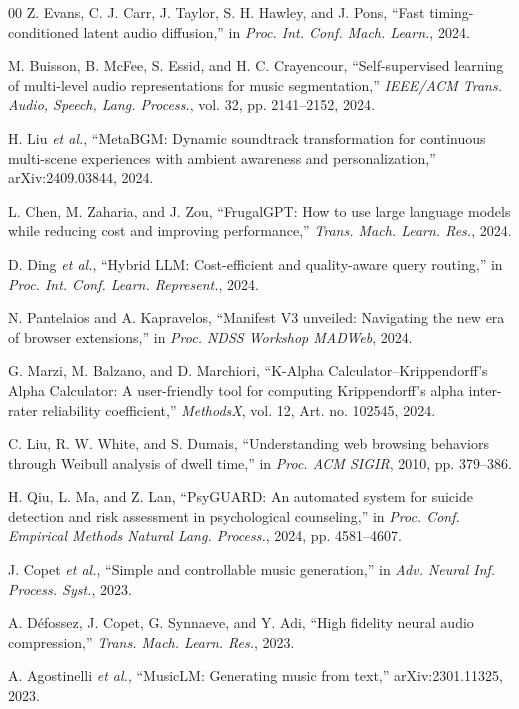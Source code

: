 \documentclass[conference]{IEEEtran}
\begin{document}
\begin{thebibliography}{00}
 Z. Evans, C. J. Carr, J. Taylor, S. H. Hawley, and J. Pons, ``Fast timing-conditioned latent audio diffusion,'' in \emph{Proc. Int. Conf. Mach. Learn.}, 2024.

 M. Buisson, B. McFee, S. Essid, and H. C. Crayencour, ``Self-supervised learning of multi-level audio representations for music segmentation,'' \emph{IEEE/ACM Trans. Audio, Speech, Lang. Process.}, vol. 32, pp. 2141--2152, 2024.

 H. Liu \emph{et al.}, ``MetaBGM: Dynamic soundtrack transformation for continuous multi-scene experiences with ambient awareness and personalization,'' arXiv:2409.03844, 2024.

 L. Chen, M. Zaharia, and J. Zou, ``FrugalGPT: How to use large language models while reducing cost and improving performance,'' \emph{Trans. Mach. Learn. Res.}, 2024.

 D. Ding \emph{et al.}, ``Hybrid LLM: Cost-efficient and quality-aware query routing,'' in \emph{Proc. Int. Conf. Learn. Represent.}, 2024.

 N. Pantelaios and A. Kapravelos, ``Manifest V3 unveiled: Navigating the new era of browser extensions,'' in \emph{Proc. NDSS Workshop MADWeb}, 2024.

 G. Marzi, M. Balzano, and D. Marchiori, ``K-Alpha Calculator--Krippendorff's Alpha Calculator: A user-friendly tool for computing Krippendorff's alpha inter-rater reliability coefficient,'' \emph{MethodsX}, vol. 12, Art. no. 102545, 2024.

 C. Liu, R. W. White, and S. Dumais, ``Understanding web browsing behaviors through Weibull analysis of dwell time,'' in \emph{Proc. ACM SIGIR}, 2010, pp. 379--386.

 H. Qiu, L. Ma, and Z. Lan, ``PsyGUARD: An automated system for suicide detection and risk assessment in psychological counseling,'' in \emph{Proc. Conf. Empirical Methods Natural Lang. Process.}, 2024, pp. 4581--4607.

 J. Copet \emph{et al.}, ``Simple and controllable music generation,'' in \emph{Adv. Neural Inf. Process. Syst.}, 2023.

 A. D\'efossez, J. Copet, G. Synnaeve, and Y. Adi, ``High fidelity neural audio compression,'' \emph{Trans. Mach. Learn. Res.}, 2023.

 A. Agostinelli \emph{et al.}, ``MusicLM: Generating music from text,'' arXiv:2301.11325, 2023.


\end{thebibliography}
\end{document}
